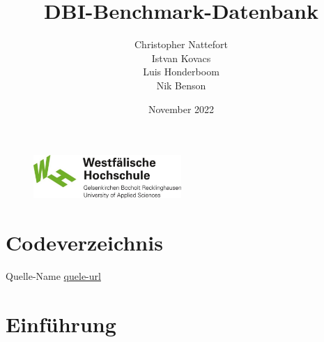 \documentclass[12pt]{article}
\title{DBI-Benchmark-Datenbank}
\author{
    Christopher Nattefort \\
    Istvan Kovacs \\
    Luis Honderboom \\
    Nik Benson}
\date{November 2022}
\begin{document}
    \begin{titlepage}
        \centering
        \maketitle
        \thispagestyle{empty}

        \begin{figure}
            \centering
            \includegraphics[width=0.5\textwidth]{img/whs}
            \label{fig:figure}
        \end{figure}

    \end{titlepage}

    \newpage

    \setcounter{page}{2}

    \RaggedRight
    \tableofcontents

    \newpage
    \listoffigures

    \newpage
    \listoftables

    \newpage
    \section*{Codeverzeichnis}
    \renewcommand\listoflistingscaption{}
    \listoflistings

    \newpage
    \begin{thebibliography}{9}
        Quelle-Name \url{quele-url}
    \end{thebibliography}

    \newpage

    \justifying

    \section{Einführung}
\end{document}
